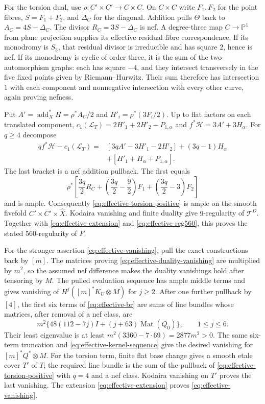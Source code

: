 For the torsion dual, use $\rho:C'\times C'\to C\times C$.
On $C\times C$ write $F_1,F_2$ for the point fibres,
$S=F_1+F_2$, and $\Delta_C$ for the diagonal. Addition pulls
$\Theta$ back to $A_C=4S-\Delta_C$. The divisor
$R_C=3S-\Delta_C$ is nef. A degree-three map $C\to\mathbb P^1$
from plane projection supplies its effective residual fibre
correspondence. If its monodromy is $S_3$, that residual divisor
is irreducible and has square $2$, hence is nef. If its monodromy
is cyclic of order three, it is the sum of the two automorphism
graphs: each has square $-4$, and they intersect transversely
in the five fixed points given by Riemann--Hurwitz. Their sum
therefore has intersection $1$ with each component and nonnegative
intersection with every other curve, again proving nefness.

Put $A'=\operatorname{add}_X^*H=\rho^*A_C/2$ and
$H'_i=\rho^*(3F_i/2)$. Up to flat factors on each translated
component,
$c_1(\mathcal L_T)=2H'_1+2H'_2-P_{1,\alpha}$ and
$f^*\mathcal H=3A'+3H_\alpha$. For $q\ge4$ decompose
\begin{equation}\label{eq:effective-torsion-positive}
 \begin{split}
 qf^*\mathcal H-c_1(\mathcal L_T)
 ={}&[3qA'-3H'_1-2H'_2]+(3q-1)H_\alpha\\
    &+[H'_1+H_\alpha+P_{1,\alpha}].
 \end{split}                                               
\end{equation}
The last bracket is a nef addition pullback. The first equals
\[
 \rho^*\left[\frac{3q}{2}R_C+
       \left(\frac{3q}{2}-\frac92\right)F_1+
       \left(\frac{3q}{2}-3\right)F_2\right]
\]
and is ample. Consequently \eqref{eq:effective-torsion-positive} is ample on the smooth
fivefold $C'\times C'\times\widehat X$. Kodaira vanishing and
finite duality give $9$-regularity of $\mathcal T^D$.
Together with \eqref{eq:effective-extension} and \eqref{eq:effective-reg560}, this proves the stated
$560$-regularity of $F$.

For the stronger assertion \eqref{eq:effective-vanishing}, pull the exact constructions
back by $[m]$. The matrices proving \eqref{eq:effective-duality-vanishing} are multiplied by
$m^2$, so the assumed nef difference makes the duality
vanishings hold after tensoring by $M$. The pulled evaluation
sequence has ample middle terms and gives vanishing of
$H^j([m]^*K_U\otimes M)$ for $j\ge2$.
After one further pullback by $[4]$, the first six terms of
\eqref{eq:effective-br} are sums of line bundles whose matrices, after removal
of a nef class, are
\[
 m^2\{48(112-7j)I+(j+63)\operatorname{Mat}(Q_0)\},
 \qquad1\le j\le6.
\]
Their least eigenvalue is at least
$m^2(3360-7\cdot69)=2877m^2>0$. The same six-term truncation
and \eqref{eq:effective-kernel-sequence} give the desired vanishing for $[m]^*Q^*\otimes M$.
For the torsion term, finite flat base change gives a smooth
etale cover $T'$ of $T$; the required line bundle is the sum
of the pullback of \eqref{eq:effective-torsion-positive} with $q=4$ and a nef class.
Kodaira vanishing on $T'$ proves the last vanishing.
The extension \eqref{eq:effective-extension} proves \eqref{eq:effective-vanishing}.

